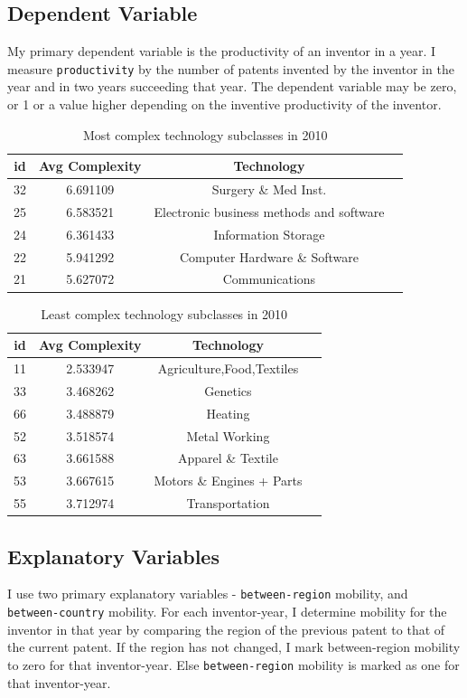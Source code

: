 \documentclass[12pt]{article}
\begin{document}
\subsection{Dependent Variable}
My primary dependent variable is the productivity of an inventor in a year.  I measure \texttt{productivity} by the number of patents invented by the inventor in the year and in two years succeeding that year. The dependent variable may be zero, or 1 or a value higher depending on the inventive productivity of the inventor.


\begin{table}[htbp]\centering \caption{Most complex technology subclasses in 2010 \label{sumstat}}
\begin{tabular}{l c c  c}\hline\hline
\multicolumn{1}{c}{\textbf{id}} & \textbf{Avg Complexity} & \textbf{Technology} \\ \hline
32	&6.691109	&Surgery \& Med Inst.\\
25	&6.583521	&Electronic business methods and software\\
24	&6.361433	&Information Storage\\
22	&5.941292	&Computer Hardware \& Software\\
21	&5.627072	&Communications\\
\hline
\end{tabular}
\end{table}
	

	
\begin{table}[htbp]\centering \caption{Least complex technology subclasses in 2010 \label{sumstat}}
\begin{tabular}{l c c  c}\hline\hline
\multicolumn{1}{c}{\textbf{id}} & \textbf{Avg Complexity} & \textbf{Technology} \\ \hline
11	&2.533947	&Agriculture,Food,Textiles\\
33	&3.468262	&Genetics\\
66	&3.488879	&Heating\\
52	&3.518574	&Metal Working\\
63	&3.661588	&Apparel \& Textile\\
53	&3.667615	&Motors \& Engines + Parts\\
55	&3.712974	&Transportation\\
\hline
\end{tabular}
\end{table}


\subsection{Explanatory Variables}
I use two primary explanatory variables - \texttt{between-region} mobility, and \texttt{between-country} mobility.  For each inventor-year,  I  determine mobility for the inventor in that year by comparing the region  of the previous patent to that of the current patent. If the region has not changed, I mark between-region mobility to zero for that inventor-year. Else \texttt{between-region} mobility is marked as one for that inventor-year.\par
\end{document}
